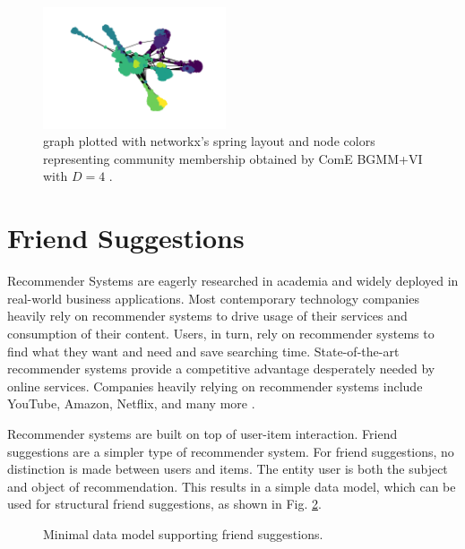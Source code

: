 \documentclass[conference]{IEEEtran}
\begin{document}
\begin{figure}[htbp]
    \centering
    \includegraphics[width=0.48\textwidth]{images/fb/graph_d4.png}
    \caption{\citet{social_circles_fb} graph plotted with networkx's spring layout and node colors representing community membership obtained by ComE BGMM+VI with $D=4$ \cite{networkx}.}
    \label{fig:fb_graph}
\end{figure}


\section{Friend Suggestions}

Recommender Systems are eagerly researched in academia and widely deployed in real-world business applications. Most contemporary technology companies heavily rely on recommender systems to drive usage of their services and consumption of their content. Users, in turn, rely on recommender systems to find what they want and need and save searching time. State-of-the-art recommender systems provide a competitive advantage desperately needed by online services. Companies heavily relying on recommender systems include YouTube, Amazon, Netflix, and many more \cite{Rocca19}.

Recommender systems are built on top of user-item interaction. Friend suggestions are a simpler type of recommender system. For friend suggestions, no distinction is made between users and items. The entity user is both the subject and object of recommendation. This results in a simple data model, which can be used for structural friend suggestions, as shown in Fig. \ref{fig:data_model}.

\begin{figure}[htbp]
    \centering
    \caption{Minimal data model supporting friend suggestions.}
    \label{fig:data_model}
\end{figure}
\end{document}

